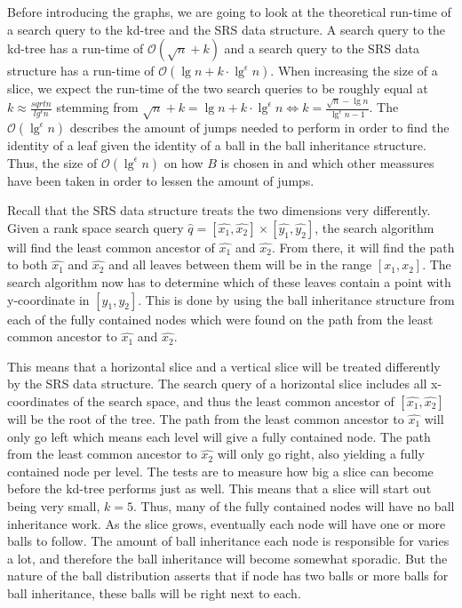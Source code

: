 Before introducing the graphs, we are going to look at the theoretical run-time of a search query to the kd-tree and the SRS data structure. A search query to the kd-tree has a run-time of $\mathcal{O}(\sqrt{n}+k)$ and a search query to the SRS data structure has a run-time of $\mathcal{O}(\lg n + k \cdot \lg^\epsilon n)$. When increasing the size of a slice, we expect the run-time of the two search queries to be roughly equal at $k \approx \frac{sqrt{n}}{lg^\epsilon n}$ stemming from $\sqrt{n} + k = \lg n + k \cdot \lg^\epsilon n \Leftrightarrow k = \frac{\sqrt{n} - \lg n}{\lg^\epsilon n - 1}$. The $\mathcal{O}(\lg^\epsilon n)$ describes the amount of jumps needed to perform in order to find the identity of a leaf given the identity of a ball in the ball inheritance structure. Thus, the size of $\mathcal{O}(\lg^\epsilon n)$ on how $B$ is chosen in  and which other meassures have been taken in order to lessen the amount of jumps. 

Recall that the SRS data structure treats the two dimensions very differently. Given a rank space search query $\hat{q} = [\hat{x_1}, \hat{x_2}] \times [\hat{y_1}, \hat{y_2}]$, the search algorithm will find the least common ancestor of $\hat{x_1}$ and $\hat{x_2}$. From there, it will find the path to both $\hat{x_1}$ and $\hat{x_2}$ and all leaves between them will be in the range $[x_1, x_2]$. The search algorithm now has to determine which of these leaves contain a point with y-coordinate in $[y_1, y_2]$. This is done by using the ball inheritance structure from each of the fully contained nodes which were found on the path from the least common ancestor to $\hat{x_1}$ and $\hat{x_2}$.

This means that a horizontal slice and a vertical slice will be treated differently by the SRS data structure. The search query of a horizontal slice includes all x-coordinates of the search space, and thus the least common ancestor of $[\hat{x_1}, \hat{x_2}]$ will be the root of the tree. The path from the least common ancestor to $\hat{x_1}$ will only go left which means each level will give a fully contained node. The path from the least common ancestor to $\hat{x_2}$ will only go right, also yielding a fully contained node per level. The tests are to measure how big a slice can become before the kd-tree performs just as well. This means that a slice will start out being very small, $k=5$. Thus, many of the fully contained nodes will have no ball inheritance work. As the slice grows, eventually each node will have one or more balls to follow. The amount of ball inheritance each node is responsible for varies a lot, and therefore the ball inheritance will become somewhat sporadic. But the nature of the ball distribution asserts that if node has two balls or more balls for ball inheritance, these balls will be right next to each.

